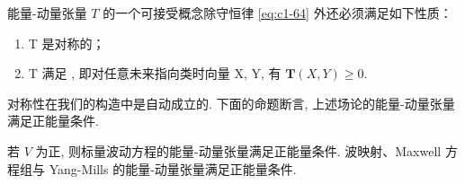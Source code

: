能量-动量张量 $T$ 的一个可接受概念除守恒律 \eqref{eq:c1-64} 外还必须满足如下性质：
\begin{enumerate}
\item T 是对称的；
\item T 满足 , 即对任意未来指向类时向量 X, Y, 有 $\mathbf{T}(X, Y) \geq 0$. 
\end{enumerate}

对称性在我们的构造中是自动成立的. 下面的命题断言, 上述场论的能量-动量张量满足正能量条件. 

\begin{proposition}\label{prop:c1-2.1}
若 $V$ 为正, 则标量波动方程的能量-动量张量满足正能量条件. 波映射、Maxwell 方程组与 Yang-Mills 的能量-动量张量满足正能量条件. 
\end{proposition}

